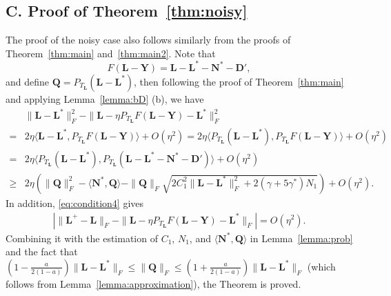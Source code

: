 \documentclass[12pt]{article}
\newcommand{\bL}{\boldsymbol{L}}
\newcommand{\bQ}{\boldsymbol{Q}}
\newcommand{\bD}{\boldsymbol{D}}
\def\bQ{\boldsymbol{Q}}
\def\bY{\boldsymbol{Y}}
\def\bN{\boldsymbol{N}}
\def\bW{\boldsymbol{W}}
\theoremstyle{plain}
\theoremstyle{definition}
\theoremstyle{plain}
\theoremstyle{plain}
\theoremstyle{remark}
\begin{document}
\subsection*{C. Proof of Theorem~\ref{thm:noisy}}
The proof of the noisy case also follows similarly from the proofs of Theorem~\ref{thm:main} and~\ref{thm:main2}. Note that
\[
F(\bL-\bY)=\bL-\bL^*-\bN^*-\bD',
\]
and define $\bQ=P_{T_{\bL}}(\bL-\bL^*)$, then following the proof of Theorem~\ref{thm:main} and applying Lemma~\ref{lemma:bD} (b), we have
\begin{align*}\nonumber
&\|\bL-\bL^*\|_F^2-\|\bL-\eta P_{T_{\bL}} F(\bL-\bY)-\bL^*\|_F^2 \\\nonumber
=&2 \eta\langle\bL-\bL^*,P_{T_{\bL}} F(\bL-\bY)\rangle+O(\eta^2)=2 \eta\langle P_{T_{\bL}} (\bL-\bL^*),P_{T_{\bL}} F(\bL-\bY)\rangle+O(\eta^2)\\
=&2 \eta\langle P_{T_{\bL}} (\bL-\bL^*),P_{T_{\bL}} (\bL-\bL^*-\bN^*-\bD')\rangle+O(\eta^2)\\
\geq &2\eta\left(\|\bQ\|_F^2-\langle\bN^*,\bQ\rangle-\|\bQ\|_F\sqrt{2C_1^2\|\bL-\bL^*\|_F^2+2(\gamma+5\gamma^*)N_1}\right)+O(\eta^2).
\end{align*}
In addition, \eqref{eq:condition4} gives \begin{align}\nonumber
\left|\|\bL^+-\bL\|_F-\|\bL-\eta P_{T_{\bL}} F(\bL-\bY)-\bL^*\|_F\right|=O(\eta^2).
\end{align}
Combining it with the estimation of $C_1$, $N_1$, and  $\langle\bN^*,\bQ\rangle$ in Lemma~\ref{lemma:prob} and the fact that $(1-\frac{a}{2(1-a)})\|\bL-\bL^*\|_F\leq \|\bQ\|_F\leq (1+\frac{a}{2(1-a)})\|\bL-\bL^*\|_F$ (which follows from Lemma~\ref{lemma:approximation}), the Theorem is proved. 

\end{document}
